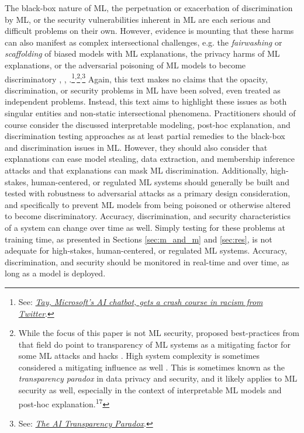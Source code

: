 \documentclass[information,article,submit,moreauthors,pdftex]{definitions/mdpi}
\begin{document}
The black-box nature of ML, the perpetuation or exacerbation of discrimination by ML, or the security vulnerabilities inherent in ML are each serious and difficult problems on their own. However, evidence is mounting that these harms can also manifest as complex intersectional challenges, e.g. the \textit{fairwashing} or \textit{scaffolding} of biased models with ML explanations, the privacy harms of ML explanations, or the adversarial poisoning of ML models to become discriminatory \cite{shokri2019privacy}, \cite{fair_washing}, \cite{scaffolding}.\footnote{See: \href{https://www.theguardian.com/technology/2016/mar/24/tay-microsofts-ai-chatbot-gets-a-crash-course-in-racism-from-twitter}{\textit{Tay, Microsoft's AI chatbot, gets a crash course in racism from Twitter}}.}\textsuperscript{,}\footnote{While the focus of this paper is not ML security, proposed best-practices from that field do point to transparency of ML systems as a mitigating factor for some ML attacks and hacks \cite{papernot2018marauder}. High system complexity is sometimes considered a mitigating influence as well \cite{hoare19811980}. This is sometimes known as the \textit{transparency paradox} in data privacy and security, and it likely applies to ML security as well, especially in the context of interpretable ML models and post-hoc explanation.\textsuperscript{17}}\textsuperscript{,}\footnote{See: \href{https://hbr.org/2019/12/the-ai-transparency-paradox}{\textit{The AI Transparency Paradox}}.} Again, this text makes no claims that the opacity, discrimination, or security problems in ML have been solved, even treated as independent problems. Instead, this text aims to highlight these issues as both singular entities and non-static intersectional phenomena. Practitioners should of course consider the discussed interpretable modeling, post-hoc explanation, and discrimination testing approaches as at least partial remedies to the black-box and discrimination issues in ML. However, they should also consider that explanations can ease model stealing, data extraction, and membership inference attacks and that explanations can mask ML discrimination. Additionally, high-stakes, human-centered, or regulated ML systems should generally be built and tested with robustness to adversarial attacks as a primary design consideration, and specifically to prevent ML models from being poisoned or otherwise altered to become discriminatory. Accuracy, discrimination, and security characteristics of a system can change over time as well. Simply testing for these problems at training time, as presented in Sections \ref{sec:m_and_m} and \ref{sec:res}, is not adequate for high-stakes, human-centered, or regulated ML systems. Accuracy, discrimination, and security should be monitored in real-time and over time, as long as a model is deployed.
\end{document}
